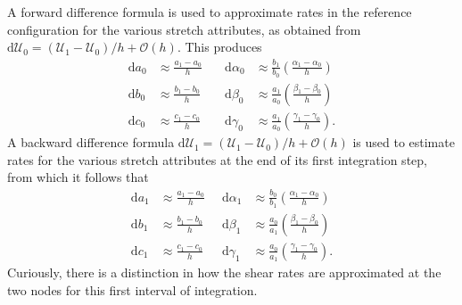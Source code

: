 A forward difference formula is used to approximate rates in the reference configuration for the various stretch attributes, as obtained from $\mathrm{d} \boldsymbol{\mathcal{U}}_0 = ( \boldsymbol{\mathcal{U}}_1 -  \boldsymbol{\mathcal{U}}_0 ) / h + \mathcal{O}(h)$.  This produces
\begin{equation}
\begin{aligned}
\mathrm{d} a_0 &
\approx \frac {a_1 - a_0}{h} \quad &
\mathrm{d} \alpha_0 & 
\approx \frac{b_1}{b_0} \left(\frac{\alpha_1 - \alpha_0}{h} \right) \\
\mathrm{d} b_0 & 
\approx \frac {b_1 - b_0}{h} \quad & 
\mathrm{d} \beta_0 & 
\approx \frac{a_1}{a_0} \left( \frac{\beta_1 - \beta_0}{h} \right) \\
\mathrm{d} c_0 & 
\approx \frac {c_1 - c_0}{h} \quad & 
\mathrm{d} \gamma_0 & \approx \frac{a_1}{a_0} \left( \frac{\gamma_1 - \gamma_0}{h}\right) .
\end{aligned}
\label{forwardDifference1stOrder3D}
\end{equation}
A backward difference formula $\mathrm{d} \boldsymbol{\mathcal{U}}_1 = ( \boldsymbol{\mathcal{U}}_1 -  \boldsymbol{\mathcal{U}}_0 ) / h + \mathcal{O}(h)$ is used to estimate rates for the various stretch attributes at the end of its first integration step, from which it follows that
\begin{equation}
\begin{aligned}
\mathrm{d} a_1 & 
\approx \frac {a_1 - a_0}{h} \;\; & 
\mathrm{d} \alpha_1 & 
\approx \frac {b_0}{b_1} \left( \frac{\alpha_1 - \alpha_0}{h} \right) \\
\mathrm{d} b_1 & 
\approx \frac {b_1 - b_0}{h} \;\; & 
\mathrm{d} \beta_1 & 
\approx \frac {a_0} {a_1} \left( \frac{\beta_1 - \beta_0}{h} \right) \\
\mathrm{d} c_1 & 
\approx \frac {c_1 - c_0}{h} \;\; & 
\mathrm{d} \gamma_1 & 
\approx \frac{a_0}{a_1} \left(\frac{\gamma_1 - \gamma_0}{h} \right) .
\end{aligned}
\label{backwardDifference1stOrder3D}
\end{equation}
Curiously, there is a distinction in how the shear rates are approximated at the two nodes for this first interval of integration.

